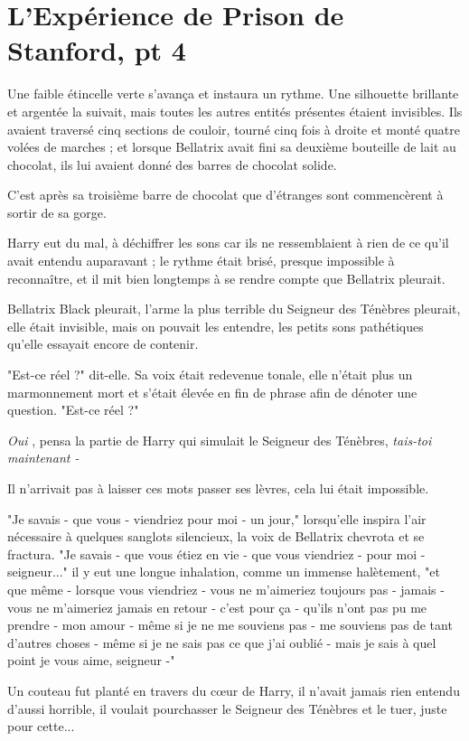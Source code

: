 
\chapter{L'Expérience de Prison de Stanford, pt 4}

Une faible étincelle verte s'avança et instaura un rythme. Une silhouette brillante et argentée la suivait, mais toutes les autres entités présentes étaient invisibles. Ils avaient traversé cinq sections de couloir, tourné cinq fois à droite et monté quatre volées de marches ; et lorsque Bellatrix avait fini sa deuxième bouteille de lait au chocolat, ils lui avaient donné des barres de chocolat solide.

C'est après sa troisième barre de chocolat que d'étranges sont commencèrent à sortir de sa gorge.

Harry eut du mal, à déchiffrer les sons car ils ne ressemblaient à rien de ce qu'il avait entendu auparavant ; le rythme était brisé, presque impossible à reconnaître, et il mit bien longtemps à se rendre compte que Bellatrix pleurait.

Bellatrix Black pleurait, l'arme la plus terrible du Seigneur des Ténèbres pleurait, elle était invisible, mais on pouvait les entendre, les petits sons pathétiques qu'elle essayait encore de contenir.

"Est-ce réel ?" dit-elle. Sa voix était redevenue tonale, elle n'était plus un marmonnement mort et s'était élevée en fin de phrase afin de dénoter une question. "Est-ce réel ?"

\emph{Oui} , pensa la partie de Harry qui simulait le Seigneur des Ténèbres, \emph{tais-toi maintenant -} 

Il n'arrivait pas à laisser ces mots passer ses lèvres, cela lui était impossible.

"Je savais - que vous - viendriez pour moi - un jour," lorsqu'elle inspira l'air nécessaire à quelques sanglots silencieux, la voix de Bellatrix chevrota et se fractura. "Je savais - que vous étiez en vie - que vous viendriez - pour moi - seigneur..." il y eut une longue inhalation, comme un immense halètement, "et que même - lorsque vous viendriez - vous ne m'aimeriez toujours pas - jamais - vous ne m'aimeriez jamais en retour - c'est pour ça - qu'ils n'ont pas pu me prendre - mon amour - même si je ne me souviens pas - me souviens pas de tant d'autres choses - même si je ne sais pas ce que j'ai oublié - mais je sais à quel point je vous aime, seigneur -"

Un couteau fut planté en travers du cœur de Harry, il n'avait jamais rien entendu d'aussi horrible, il voulait pourchasser le Seigneur des Ténèbres et le tuer, juste pour cette...

